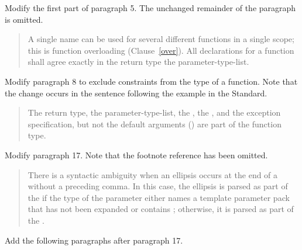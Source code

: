 Modify the first part of paragraph 5. The unchanged remainder of the paragraph
is omitted.

\begin{quote}
\setcounter{Paras}{4}
\pnum
A single name can be used for several different functions in a single 
scope; this is function overloading (Clause~\ref{over}). 
%
All declarations for a function shall agree exactly in  
the return type\added{,}  the parameter-type-list.
\end{quote}

Modify paragraph 8 to exclude constraints from the type of a function.
Note that the change occurs in the sentence following the example
in the \Cpp Standard.

\begin{quote}
\setcounter{Paras}{7}
\pnum
The return type, the parameter-type-list, the , 
the , and the exception specification, but not 
the default arguments ()
are part of the function type.
\end{quote}

Modify paragraph 17. Note that the footnote reference has been
omitted.

\begin{quote}
\setcounter{Paras}{16}
\pnum
There is a syntactic ambiguity when an ellipsis occurs at the end of a 
 without a preceding comma. In this 
case, the ellipsis is parsed as part of the  
if the type of the parameter either names a template parameter pack that has 
not been expanded or contains 
; 
otherwise, it is parsed as part
of the .
\end{quote}

Add the following paragraphs after paragraph 17.

